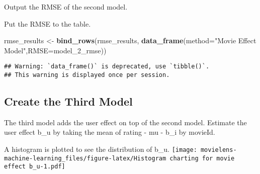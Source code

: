 \documentclass[]{article}
\newenvironment{Shaded}{\begin{snugshade}}{\end{snugshade}}
\newcommand{\KeywordTok}[1]{\textcolor[rgb]{0.13,0.29,0.53}{\textbf{#1}}}
\newcommand{\DataTypeTok}[1]{\textcolor[rgb]{0.13,0.29,0.53}{#1}}
\newcommand{\StringTok}[1]{\textcolor[rgb]{0.31,0.60,0.02}{#1}}
\newcommand{\OperatorTok}[1]{\textcolor[rgb]{0.81,0.36,0.00}{\textbf{#1}}}
\newcommand{\NormalTok}[1]{#1}
\begin{document}
Output the RMSE of the second model.

\begin{Shaded}
\end{Shaded}

Put the RMSE to the table.

\begin{Shaded}
\begin{Highlighting}[]
\NormalTok{rmse_results <-}\StringTok{ }\KeywordTok{bind_rows}\NormalTok{(rmse_results, }\KeywordTok{data_frame}\NormalTok{(}\DataTypeTok{method=}\StringTok{"Movie Effect Model"}\NormalTok{,}\DataTypeTok{RMSE=}\NormalTok{model_2_rmse))}
\end{Highlighting}
\end{Shaded}

\begin{verbatim}
## Warning: `data_frame()` is deprecated, use `tibble()`.
## This warning is displayed once per session.
\end{verbatim}

\subsection{Create the Third Model}\label{create-the-third-model}

The third model adds the user effect on top of the second model.
Estimate the user effect b\_u by taking the mean of rating - mu - b\_i
by movieId.

\begin{Shaded}
\end{Shaded}

A histogram is plotted to see the distribution of b\_u.
\texttt{[image: movielens-machine-learning\_files/figure-latex/Histogram charting for movie effect b\_u-1.pdf]}
\end{document}

